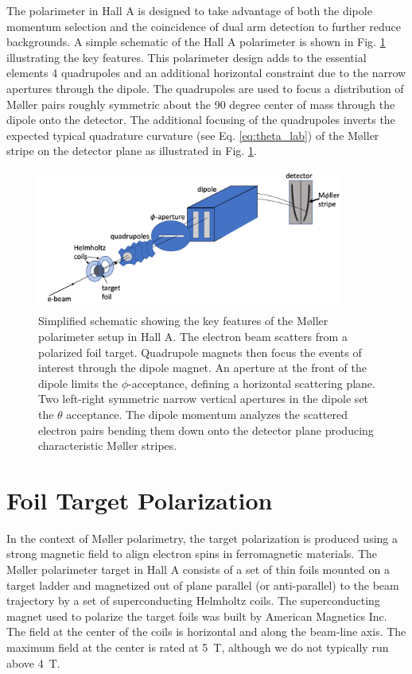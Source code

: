 \documentclass[preprint,12pt]{elsarticle}
\begin{document}
The polarimeter in Hall A is designed to take advantage of both the dipole momentum selection and the coincidence of dual arm detection to further reduce backgrounds. A simple schematic of the Hall A polarimeter is shown in Fig. \ref{fig:moller_diag} illustrating the key features. This polarimeter design adds to the essential elements 4 quadrupoles and an additional horizontal constraint due to the narrow apertures through the dipole. The quadrupoles are used to focus a distribution of M\o ller pairs roughly symmetric about the 90 degree center of mass through the dipole onto the detector. The additional focusing of the quadrupoles inverts the expected typical quadrature curvature (see Eq. \ref{eq:theta_lab}) of the M\o ller stripe on the detector plane as illustrated in Fig. \ref{fig:moller_diag}.
\begin{figure}[ht]
\centering
\includegraphics[width=0.9\textwidth]{simple_moller_diagram.png}
\caption{\label{fig:moller_diag}Simplified schematic showing the key features of the M\o ller polarimeter setup in Hall A. The electron beam scatters from a polarized foil target. Quadrupole magnets then focus the events of interest through the dipole magnet. An aperture at the front of the dipole limits the $\phi$-acceptance, defining a horizontal scattering plane. Two left-right symmetric narrow vertical apertures in the dipole set the $\theta$ acceptance. The dipole momentum analyzes the scattered electron pairs bending them down onto the detector plane producing characteristic M\o ller stripes.}
\end{figure}

\section{Foil Target Polarization}
In the context of M\o ller polarimetry, the target polarization is produced using a strong magnetic field to align electron spins in ferromagnetic materials. The M\o ller polarimeter target in Hall A consists of a set of thin foils mounted on a target ladder and magnetized out of plane parallel (or anti-parallel) to the beam trajectory by a set of superconducting Helmholtz coils. The superconducting magnet used to polarize the target foils was built by American Magnetics Inc. The field at the center of the coils is horizontal and along the beam-line axis. The maximum field at the center is rated at 5~T, although we do not typically run above 4~T. 
\end{document}
